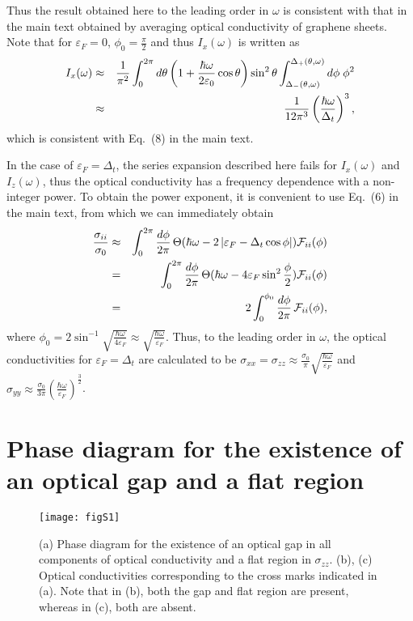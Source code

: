 \documentclass[aps,twocolumn,floatfix]{revtex4-1}
\begin{document}
Thus the result obtained here to the leading order in $\omega$ is consistent with that in the main text obtained by averaging optical conductivity of graphene sheets.
Note that for $\varepsilon_{F}=0$, $\phi_0=\frac{\pi}{2}$ and thus $I_x(\omega)$ is written as
\begin{eqnarray}
I_x(\omega)
&\approx&
{1\over \pi^2}\int_0^{2\pi} d\theta
\left(1+\frac{\hbar\omega}{2\varepsilon_0}\cos{\theta}\right)
\sin^2{\theta}
\int_{\Delta_{-}(\theta,\omega)}^{\Delta_{+}(\theta,\omega)} d\phi \;
\phi^2 \nonumber\\
&\approx&
\frac{1}{12\pi^3}\left(\frac{\hbar\omega}{\Delta_{t}}\right)^3,
\end{eqnarray}
which is consistent with Eq.~(8) in the main text.

In the case of $\varepsilon_{F}=\Delta_{t}$, the series expansion described here fails for $I_{x}(\omega)$ and $I_{z}(\omega)$, thus the optical conductivity has a frequency dependence with a non-integer power. To obtain the power exponent, it is convenient to use Eq.~(6) in the main text, from which we can immediately obtain
\begin{eqnarray}
{\sigma_{ii} \over \sigma_0}
&\approx&
\int_{0}^{2\pi} {d\phi\over 2\pi}\,
\Theta({\hbar\omega-2\left|\varepsilon_{F}-\Delta_{t}\cos{\phi}\right|}) {\mathcal F}_{ii}(\phi)\nonumber\\
&=&
\int_{0}^{2\pi} {d\phi\over 2\pi}\,
\Theta({\hbar\omega-4\varepsilon_{F}\sin^2{\frac{\phi}{2}}}) {\mathcal F}_{ii}(\phi)\nonumber\\
&=&
2\int_{0}^{\phi_0} {d\phi\over 2\pi}\,
{\mathcal F}_{ii}(\phi),
\end{eqnarray}
where $\phi_0=2\sin^{-1}\sqrt{\frac{\hbar\omega}{4\varepsilon_{F}}}\approx\sqrt{\frac{\hbar\omega}{\varepsilon_{F}}}$. Thus, to the leading order in $\omega$, the optical conductivities for $\varepsilon_{F}=\Delta_{t}$ are calculated to be $\sigma_{xx}=\sigma_{zz}\approx\frac{\sigma_0}{\pi}\sqrt{\frac{\hbar\omega}{\varepsilon_{F}}}$ and $\sigma_{yy}\approx \frac{\sigma_0}{3\pi}\left(\frac{\hbar\omega}{\varepsilon_{F}}\right)^\frac{3}{2}$.


\section{Phase diagram for the existence of an optical gap and a flat region}
\label{sec:Phase_diagram}

\begin{figure}[!htb]
\texttt{[image: figS1]}
\caption{
(a) Phase diagram for the existence of an optical gap in all components of optical conductivity and a flat region in $\sigma_{zz}$. (b), (c) Optical conductivities corresponding to the cross marks indicated in (a). Note that in (b), both the gap and flat region are present, whereas in (c), both are absent.
}
\label{fig:phase_diagram}
\end{figure}
\end{document}
